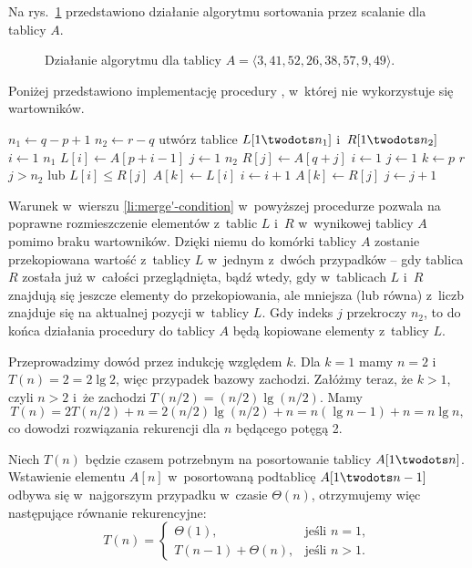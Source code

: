 
\exercise %
Na rys.\ \ref{fig:2.3-1} przedstawiono działanie algorytmu sortowania przez scalanie dla tablicy $A$.
\begin{figure}[!ht]
	\centering 
	\caption{Działanie algorytmu  dla tablicy $A=\langle3,41,52,26,38,57,9,49\rangle$.} \label{fig:2.3-1}
\end{figure}

\exercise %
Poniżej przedstawiono implementację procedury , w~której nie wykorzystuje się wartowników.
\begin{codebox}
\li	$n_1\gets q-p+1$
\li	$n_2\gets r-q$
\li	utwórz tablice $L[1\twodots n_1]$ i~$R[1\twodots n_2]$
\li	\For $i\gets1$ \To $n_1$
\li		\Do $L[i]\gets A[p+i-1]$
		\End
\li	\For $j\gets1$ \To $n_2$
\li		\Do $R[j]\gets A[q+j]$
		\End
\li	$i\gets1$
\li $j\gets1$
\li \For $k\gets p$ \To $r$
\li		\Do \If $j>n_2$ lub $L[i]\le R[j]$ \label{li:merge'-condition}
\li				\Then $A[k]\gets L[i]$
\li					$i\gets i+1$
\li				\Else $A[k]\gets R[j]$
\li					$j\gets j+1$
				\End
		\End
\end{codebox}
Warunek w~wierszu \ref{li:merge'-condition} w~powyższej procedurze pozwala na poprawne rozmieszczenie elementów z~tablic $L$ i~$R$ w~wynikowej tablicy $A$ pomimo braku wartowników.
Dzięki niemu do  komórki tablicy $A$ zostanie przekopiowana wartość z~tablicy $L$ w~jednym z~dwóch przypadków -- gdy tablica $R$ została już w~całości przeglądnięta, bądź wtedy, gdy w~tablicach $L$ i~$R$ znajdują się jeszcze elementy do przekopiowania, ale mniejsza (lub równa) z~liczb znajduje się na aktualnej pozycji w~tablicy $L$.
Gdy indeks $j$ przekroczy $n_2$, to do końca działania procedury do tablicy $A$ będą kopiowane elementy z~tablicy $L$.

\exercise %
Przeprowadzimy dowód przez indukcję względem $k$.
Dla $k=1$ mamy $n=2$ i~$T(n)=2=2\lg2$, więc przypadek bazowy zachodzi.
Załóżmy teraz, że $k>1$, czyli $n>2$ i~że zachodzi $T(n/2)=(n/2)\lg(n/2)$.
Mamy
\[
	T(n) = 2T(n/2)+n = 2(n/2)\lg(n/2)+n = n(\lg n-1)+n = n\lg n,
\]
co dowodzi rozwiązania rekurencji dla $n$ będącego potęgą 2.

\exercise %
Niech $T(n)$ będzie czasem potrzebnym na posortowanie tablicy $A[1\twodots n]$.
Wstawienie elementu $A[n]$ w~posortowaną podtablicę $A[1\twodots n-1]$ odbywa się w~najgorszym przypadku w~czasie $\Theta(n)$, otrzymujemy więc następujące równanie rekurencyjne:
\[
	T(n) =
	\begin{cases}
		\Theta(1), & \text{jeśli $n=1$}, \\
		T(n-1)+\Theta(n), & \text{jeśli $n>1$}.
	\end{cases}
\]


